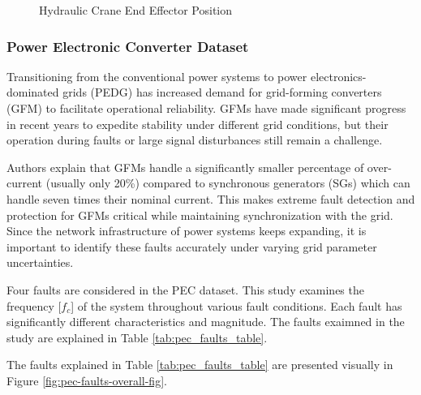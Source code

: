 \begin{figure}[H]
    
    \caption{Hydraulic Crane End Effector Position}
    \label{fig:hydraulic_pos}
\end{figure}

\subsubsection{Power Electronic Converter Dataset}
\label{ref_pec_dataset}

Transitioning from the conventional power systems to power electronics-dominated grids (PEDG) has increased demand for grid-forming converters (GFM) to facilitate operational reliability. GFMs have made significant progress in recent years %
to expedite stability under different grid conditions, but their operation during faults or large signal disturbances still remain a challenge.

Authors \cite{trainsient-stability-9523750} explain that GFMs handle a significantly smaller percentage of over-current (usually only 20\%) compared to synchronous generators (SGs) which can handle seven times their nominal current. This makes extreme fault detection and protection for GFMs critical while maintaining synchronization with the grid. Since the network infrastructure of power systems keeps expanding, it is important to identify these faults accurately under varying grid parameter uncertainties.


Four faults are considered in the PEC dataset. This study examines the frequency [$f_c$] of the system throughout various fault conditions. Each fault has significantly different characteristics and magnitude. The faults exaimned in the study are explained in Table \ref{tab:pec_faults_table}.



The faults explained in Table \ref{tab:pec_faults_table} are presented visually in Figure \ref{fig:pec-faults-overall-fig}.

